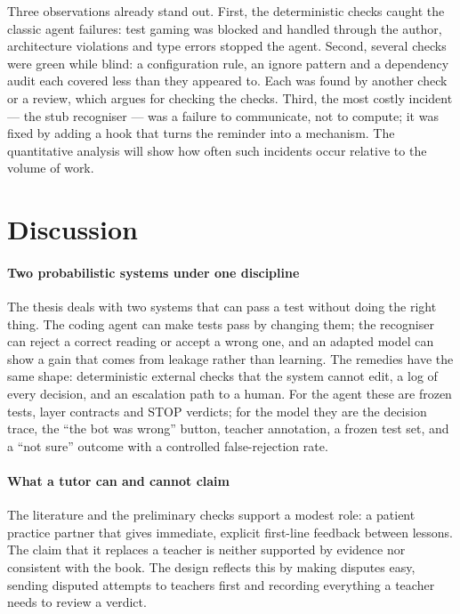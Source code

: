 Three observations already stand out. First, the deterministic checks caught the classic agent failures:
test gaming was blocked and handled through the author, architecture violations and type errors stopped
the agent. Second, several checks were green while blind: a configuration rule, an ignore pattern and a
dependency audit each covered less than they appeared to. Each was found by another check or a review, which
argues for checking the checks. Third, the most costly incident --- the stub recogniser --- was a failure to
communicate, not to compute; it was fixed by adding a hook that turns the reminder into a mechanism. The
quantitative analysis will show how often such incidents occur relative to the volume of work.

\section{Discussion}\label{sec:eval-discussion}

\paragraph{Two probabilistic systems under one discipline} The thesis deals with two systems that can pass a
test without doing the right thing. The coding agent can make tests pass by changing them; the recogniser can
reject a correct reading or accept a wrong one, and an adapted model can show a gain that comes from
leakage rather than learning. The remedies have the same shape: deterministic external
checks that the system cannot edit, a log of every decision, and an escalation path to a human. For the
agent these are frozen tests, layer contracts and STOP verdicts; for the model they are the decision trace,
the ``the bot was wrong'' button, teacher annotation, a frozen test set, and a
``not sure'' outcome with a controlled false-rejection rate.

\paragraph{What a tutor can and cannot claim} The literature and the preliminary checks support a modest
role: a patient practice partner that gives immediate, explicit first-line feedback between lessons. The
claim that it replaces a teacher is neither supported by evidence nor consistent with the book. The design
reflects this by making disputes easy, sending disputed attempts to teachers first and recording everything
a teacher needs to review a verdict.

